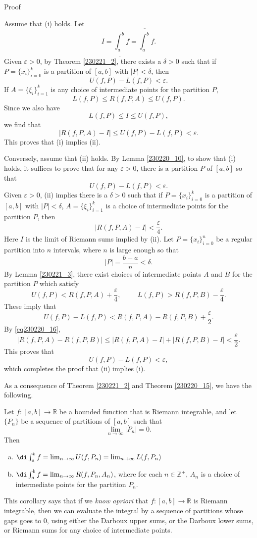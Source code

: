 \begin{myproof}{Proof}
 
Assume that (i) holds. 
Let \[I=\underline{\int_a^b }f=\overline{\int_a^b} f.\]
Given $\varepsilon>0$, by Theorem \ref{230221_2}, there exists a $\delta>0$ such that if $P=\{x_i\}_{i=0}^k$ is a partition of $[a,b]$ with $|P|<\delta$, then 
\[U(f,P)-L(f,P)<\varepsilon.\]\bp
If $A=\{\xi_i\}_{i=1}^k$ is any choice of intermediate points for the partition $P$,  
\[L(f,P)\leq R(f, P, A)\leq U(f,P).\] Since we also have
\[L(f,P)\leq I\leq U(f,P),\]we find that
\[|R(f, P, A)-I|\leq  U(f,P)-L(f,P)<\varepsilon.\]
This proves that (i) implies (ii).



Conversely,   assume that (ii) holds. By Lemma \ref{230220_10}, to show that (i) holds, it suffices to prove that
  for any $\varepsilon>0$, there is a partition $P$ of $[a,b]$ so that
\[U(f,P)-L(f,P)<\varepsilon.\]
Given $\varepsilon>0$, (ii) implies   there is  a $\delta>0$ such that if $P=\{x_i\}_{i=0}^{k}$ is a partition of $[a,b]$ with $|P|<\delta$, $A=\{\xi_i\}_{i=1}^k$ is a choice of intermediate points for the partition $P$, then
\begin{equation}\label{eq230220_16}|R(f,P,A)-I|<\frac{\varepsilon}{4}.\end{equation}Here $I$ is the limit of Riemann sums implied by (ii).  Let $P=\{x_i\}_{i=0}^n$ be  a regular partition into $n$ intervals, where $n$ is large enough so that \[|P|=\frac{b-a}{n} <\delta.\] By Lemma \ref{230221_3}, there exist choices of intermediate points $A$ and $B$ for the partition $P$ which satisfy
\[U(f,P)<R(f,P,A)+\frac{\varepsilon}{4},\hspace{1cm} L(f,P)>R(f,P,B)-\frac{\varepsilon}{4}.\] 
These imply that
\[U(f,P)-L(f,P)<R(f,P,A)-R(f,P,B)+\frac{\varepsilon}{2}.\]
 \bp By \eqref{eq230220_16},
\[|R(f,P,A)-R(f,P,B)|\leq |R(f,P,A)-I|+|R(f,P,B)-I|<\frac{\varepsilon}{2}.\]
This proves that
\[U(f,P)-L(f,P)<\varepsilon,\]which completes the proof that  (ii)  implies  (i). 

 
\end{myproof}
As a consequence of Theorem \ref{230221_2} and Theorem \ref{230220_15}, we have the following.
\begin{corollary}[label=230618_1]{}
Let $f:[a,b]\to\mathbb{R}$ be a bounded function that is Riemann integrable, and let $\{P_n\}$ be a sequence of partitions of $[a,b]$ such that
\[\lim_{n\to \infty}|P_n|=0.\]Then 
 \begin{enumerate}[(a)]
\item
$\di \int_a^b f=\lim_{n\to \infty}U(f,P_n)= \lim_{n\to \infty}L(f,P_n)$
\item $\di \int_a^b f=\lim_{n\to \infty}R(f,P_n, A_n)$, where for each $n\in\mathbb{Z}^+$, $A_n$ is a choice of intermediate points for the partition $P_n$.
\end{enumerate}
\end{corollary}
This corollary says that if we \emph{ know apriori } that $f:[a,b]\to\mathbb{R}$ is Riemann integrable, then we can evaluate the integral by a sequence of partitions whose gaps goes to 0, using either the Darboux upper sums, or the Darboux lower sums, or Riemann sums for any choice of intermediate points.  



